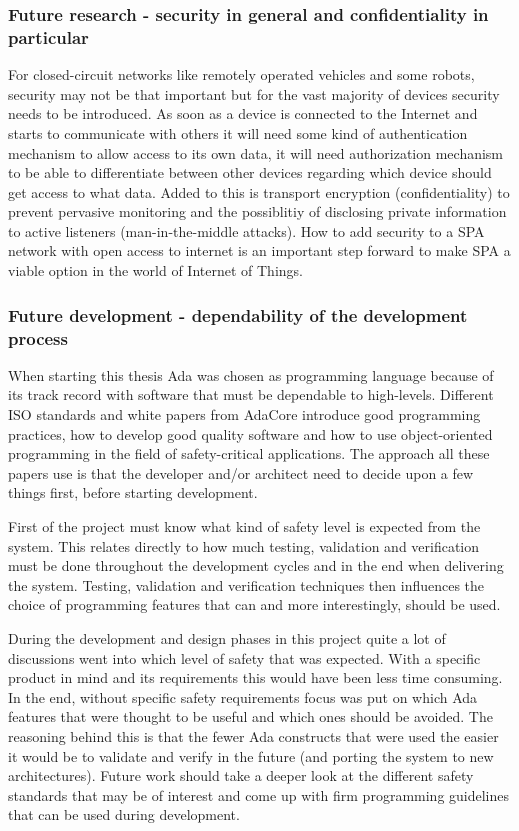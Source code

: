 \subsubsection{Future research - security in general and confidentiality in
particular}
For closed-circuit networks like remotely operated vehicles and some robots,
security may not be that important but for the vast majority of devices
security needs to be introduced. As soon as a device is connected to the
Internet and starts to communicate with others it will need some kind of
authentication mechanism to allow access to its own data, it will need
authorization mechanism to be able to differentiate between other devices
regarding which device should get access to what data. Added to this is
transport encryption (confidentiality) to prevent pervasive monitoring and the
possiblitiy of disclosing private information to active listeners
(man-in-the-middle attacks).  How to add security to a SPA network with open
access to internet is an important step forward to make SPA a viable option in
the world of Internet of Things.

\subsubsection{Future development - dependability of the development process}
When starting this thesis Ada was chosen as programming language because of its
track record with software that must be dependable to high-levels. Different
ISO standards and white papers from AdaCore introduce good programming
practices, how to develop good quality software and how to use object-oriented
programming in the field of safety-critical applications. The approach all
these papers use is that the developer and/or architect need to decide upon a
few things first, before starting development.

First of the project must know what kind of safety level is expected from the
system. This relates directly to how much testing, validation and verification
must be done throughout the development cycles and in the end when delivering
the system. Testing, validation and verification
techniques then influences the choice of programming features that can and more
interestingly, should be used.

During the development and design phases in this project quite a lot of
discussions went into which level of safety that was expected. With a specific
product in mind and its requirements this would have been less time consuming.
In the end, without specific safety requirements focus was put on which Ada
features that were thought to be useful and which ones should be avoided. The
reasoning behind this is that the fewer Ada constructs that were used the
easier it would be to validate and verify in the future (and porting the system
to new architectures).  Future work should take a deeper look at the different
safety standards that may be of interest and come up with firm programming
guidelines that can be used during development.

